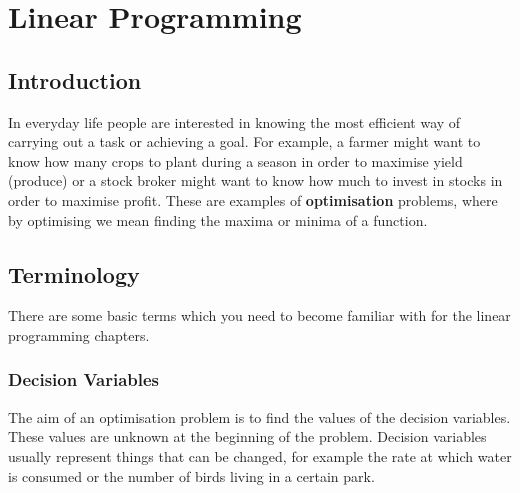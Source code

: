 \chapter{Linear Programming}


\section{Introduction}
In everyday life people are interested in knowing the most efficient way of
carrying out a task or achieving a goal. For example, a farmer might want to
know how many crops to plant during a season in order to maximise yield
(produce) or a stock broker might want to know how much to invest in stocks in order to maximise profit. These are examples of \textbf{optimisation} problems, where by optimising we mean finding the maxima or minima of a function. 



\section{Terminology}
There are some basic terms which you need to become familiar with for the linear programming chapters.

\subsection{Decision Variables}
The aim of an optimisation problem is to find the values of the decision variables. These values are unknown at the beginning of the problem. Decision variables usually represent things that can be changed, for example the rate at which water is consumed or the number of birds living in a certain park.

